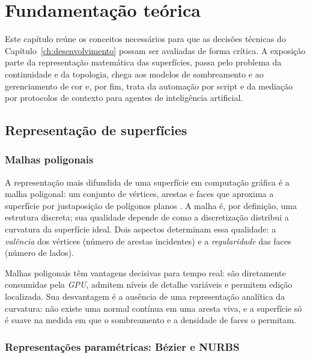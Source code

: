 \chapter{Fundamenta\c{c}\~ao te\'orica}\label{ch:fundamentacao}

Este cap\'itulo re\'une os conceitos necess\'arios para que as decis\~oes t\'ecnicas do
Cap\'itulo~\ref{ch:desenvolvimento} possam ser avaliadas de forma cr\'itica. A exposi\c{c}\~ao
parte da representa\c{c}\~ao matem\'atica das superf\'icies, passa pelo problema da
continuidade e da topologia, chega aos modelos de sombreamento e ao gerenciamento de cor e,
por fim, trata da automa\c{c}\~ao por script e da media\c{c}\~ao por protocolos de contexto para
agentes de intelig\^encia artificial.

\section{Representa\c{c}\~ao de superf\'icies}

\subsection{Malhas poligonais}

A representa\c{c}\~ao mais difundida de uma superf\'icie em computa\c{c}\~ao gr\'afica \'e a malha
poligonal: um conjunto de v\'ertices, arestas e faces que aproxima a superf\'icie por
justaposi\c{c}\~ao de pol\'igonos planos \cite{bbotsch2010}. A malha \'e, por defini\c{c}\~ao, uma
estrutura discreta; sua qualidade depende de como a discretiza\c{c}\~ao distribui a curvatura da
superf\'icie ideal. Dois aspectos determinam essa qualidade: a \emph{val\^encia} dos v\'ertices
(n\'umero de arestas incidentes) e a \emph{regularidade} das faces (n\'umero de lados).

Malhas poligonais t\^em vantagens decisivas para tempo real: s\~ao diretamente consumidas pela
\emph{GPU}, admitem n\'iveis de detalhe vari\'aveis e permitem edi\c{c}\~ao localizada. Sua
desvantagem \'e a aus\^encia de uma representa\c{c}\~ao anal\'itica da curvatura: n\~ao existe uma
normal cont\'inua em uma aresta viva, e a superf\'icie s\'o \'e suave na medida em que o
sombreamento e a densidade de faces o permitam.

\subsection{Representa\c{c}\~oes param\'etricas: B\'ezier e NURBS}

